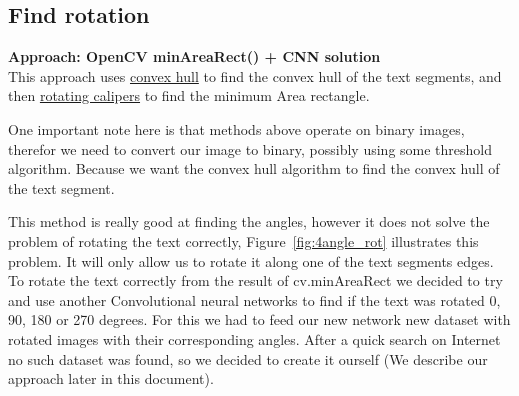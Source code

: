 \documentclass[Report.tex]{subfiles}
\begin{document}
\subsection{Find rotation}
\begin{flushleft}
  \textbf{Approach: OpenCV minAreaRect() + CNN solution} \\
  This approach uses \href{https://en.wikipedia.org/wiki/Convex_hull}{convex hull}
  to find the convex hull of the text segments, and then
  \href{https://en.wikipedia.org/wiki/Rotating_calipers}{rotating calipers} to
  find the minimum Area rectangle. \par
  One important note here is that methods above operate on binary images, therefor we need to convert our image to binary, possibly using some threshold algorithm. Because we want the convex hull algorithm to find the convex hull of the text segment. \par
  This method is really good at finding the angles, however it does not solve the problem of rotating the text correctly, Figure~\ref{fig:4angle_rot} illustrates
  this problem. It will only allow us to rotate it along one of the text segments edges. To rotate the text correctly from the result of cv.minAreaRect we decided to try and use another Convolutional neural networks to find if the text was rotated 0, 90, 180 or 270 degrees. For this we had to feed our new network new dataset with rotated images with their corresponding angles. After a quick search on Internet no such dataset was found, so we decided to create it  ourself (We describe our approach later in this document). 


\end{flushleft}
\end{document}
